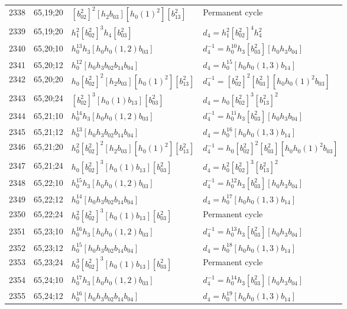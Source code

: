 \documentclass{article}
\begin{document}
\begin{longtable}{|l|l|>{\raggedright\arraybackslash}p{6cm}|>{\raggedright\arraybackslash}p{6cm}|}
\hline
2338 & 65,19;20 & $[b_{02}^2]^2[h_2b_{03}][h_0(1)^2][b_{13}^2]$ & Permanent cycle\\
2339 & 65,19;20 & $h_1^2[b_{02}^2]^3h_4[b_{03}^2]$ &$d_{4}=h_1^2[b_{02}^2]^4h_4^2$\\
\hline
2340 & 65,20;10 & $h_0^{13}h_3[h_0h_0(1, 2)b_{03}]$ & $d_{4}^{-1}=h_0^{10}h_3[b_{03}^2][h_0h_3b_{04}]$\\
\hline
2341 & 65,20;12 & $h_0^{12}[h_0h_3b_{02}b_{14}b_{04}]$ &$d_{4}=h_0^{15}[h_0h_0(1, 3)b_{14}]$\\
\hline
2342 & 65,20;20 & $h_0[b_{02}^2]^2[h_2b_{03}][h_0(1)^2][b_{13}^2]$ & $d_{4}^{-1}=[b_{02}^2]^2[b_{03}^2][h_0h_0(1)^2b_{03}]$\\
\hline
2343 & 65,20;24 & $[b_{02}^2]^3[h_0(1)b_{13}][b_{03}^2]$ &$d_{4}=h_0[b_{02}^2]^3[b_{13}^2]^2$\\
\hline
2344 & 65,21;10 & $h_0^{14}h_3[h_0h_0(1, 2)b_{03}]$ & $d_{4}^{-1}=h_0^{11}h_3[b_{03}^2][h_0h_3b_{04}]$\\
\hline
2345 & 65,21;12 & $h_0^{13}[h_0h_3b_{02}b_{14}b_{04}]$ &$d_{4}=h_0^{16}[h_0h_0(1, 3)b_{14}]$\\
\hline
2346 & 65,21;20 & $h_0^2[b_{02}^2]^2[h_2b_{03}][h_0(1)^2][b_{13}^2]$ & $d_{4}^{-1}=h_0[b_{02}^2]^2[b_{03}^2][h_0h_0(1)^2b_{03}]$\\
\hline
2347 & 65,21;24 & $h_0[b_{02}^2]^3[h_0(1)b_{13}][b_{03}^2]$ &$d_{4}=h_0^2[b_{02}^2]^3[b_{13}^2]^2$\\
\hline
2348 & 65,22;10 & $h_0^{15}h_3[h_0h_0(1, 2)b_{03}]$ & $d_{4}^{-1}=h_0^{12}h_3[b_{03}^2][h_0h_3b_{04}]$\\
\hline
2349 & 65,22;12 & $h_0^{14}[h_0h_3b_{02}b_{14}b_{04}]$ &$d_{4}=h_0^{17}[h_0h_0(1, 3)b_{14}]$\\
\hline
2350 & 65,22;24 & $h_0^2[b_{02}^2]^3[h_0(1)b_{13}][b_{03}^2]$ & Permanent cycle\\
\hline
2351 & 65,23;10 & $h_0^{16}h_3[h_0h_0(1, 2)b_{03}]$ & $d_{4}^{-1}=h_0^{13}h_3[b_{03}^2][h_0h_3b_{04}]$\\
\hline
2352 & 65,23;12 & $h_0^{15}[h_0h_3b_{02}b_{14}b_{04}]$ &$d_{4}=h_0^{18}[h_0h_0(1, 3)b_{14}]$\\
\hline
2353 & 65,23;24 & $h_0^3[b_{02}^2]^3[h_0(1)b_{13}][b_{03}^2]$ & Permanent cycle\\
\hline
2354 & 65,24;10 & $h_0^{17}h_3[h_0h_0(1, 2)b_{03}]$ & $d_{4}^{-1}=h_0^{14}h_3[b_{03}^2][h_0h_3b_{04}]$\\
\hline
2355 & 65,24;12 & $h_0^{16}[h_0h_3b_{02}b_{14}b_{04}]$ &$d_{4}=h_0^{19}[h_0h_0(1, 3)b_{14}]$\\

\end{longtable}
\end{document}
